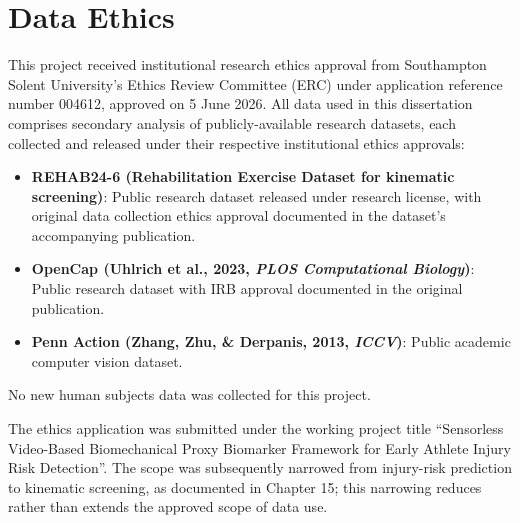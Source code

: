 \chapter{Data Ethics}
\label{app:ethics}

This project received institutional research ethics approval from Southampton Solent University's Ethics Review Committee (ERC) under application reference number 004612, approved on 5 June 2026. All data used in this dissertation comprises secondary analysis of publicly-available research datasets, each collected and released under their respective institutional ethics approvals:

\begin{itemize}
  \item \textbf{REHAB24-6 (Rehabilitation Exercise Dataset for kinematic screening)}: Public research dataset released under research license, with original data collection ethics approval documented in the dataset's accompanying publication.
  \item \textbf{OpenCap (Uhlrich et al., 2023, \emph{PLOS Computational Biology})}: Public research dataset with IRB approval documented in the original publication.
  \item \textbf{Penn Action (Zhang, Zhu, \& Derpanis, 2013, \emph{ICCV})}: Public academic computer vision dataset.
\end{itemize}

No new human subjects data was collected for this project.

The ethics application was submitted under the working project title ``Sensorless Video-Based Biomechanical Proxy Biomarker Framework for Early Athlete Injury Risk Detection''. The scope was subsequently narrowed from injury-risk prediction to kinematic screening, as documented in Chapter 15; this narrowing reduces rather than extends the approved scope of data use.

